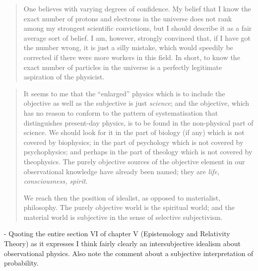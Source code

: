 \documentclass{article}
\begin{document}
\begin{quote}
    One believes with varying degrees of confidence.  My belief that I know the exact number of protons and electrons in the universe does not rank among my strongest scientific convictions, but I should describe it as a fair average sort of belief.  I am, however, strongly convinced that, if I have got the number wrong, it is just a silly mistake, which would speedily be corrected if there were more workers in this field.  In short, to know the exact number of particles in the universe is a perfectly legitimate aspiration of the physicist.  \citep[p. 171]{Eddington1939}
\end{quote}




\begin{quote}
    It seems to me that the ``enlarged'' physics which is to include the objective as well as the subjective is just \emph{science}; and the objective, which has no reason to conform to the pattern of systematisation that distinguishes present-day physics, is to be found in the non-physical part of science.  We should look for it in the part of biology (if any) which is not covered by biophysics; in the part of psychology which is not covered by psychophysics; and perhaps in the part of theology which is not covered by theophysics.  The purely objective sources of the objective element in our observational knowledge have already been named; they are \emph{life, consciousness, spirit}.
    
    We reach then the position of idealist, as opposed to materialist, philosophy.  The purely objective world is the spiritual world; and the material world is subjective in the sense of selective subjectivism.
    
    \citep[p. 68-69]{Eddington1939}
\end{quote}

- Quoting the entire section VI of chapter V (Epistemology and Relativity Theory) as it expresses I think fairly clearly an intersubjective idealism about observational physics.  Also note the comment about a subjective interpretation of probability.
\end{document}
